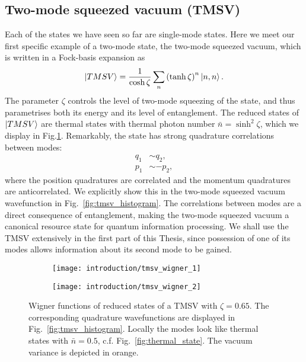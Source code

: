 \FloatBarrier
\subsection{Two-mode squeezed vacuum (TMSV)}
Each of the states we have seen so far are single-mode states. Here we meet our first specific example of a two-mode state, the two-mode squeezed vacuum, which is written in a Fock-basis expansion as
\begin{equation}\label{eqn:intro_tmsv}
\ket{TMSV} = \frac{1}{\cosh \zeta} \sum_n \left( \tanh \zeta \right)^n \ket{n, n}.
\end{equation}
The parameter $\zeta$ controls the level of two-mode squeezing of the state, and thus parametrises both its energy and its level of entanglement. The reduced states of $\ket{TMSV}$ are thermal states with thermal photon number $\bar{n} = \sinh^2 \zeta$, which we display in Fig.\ref{fig:tmsv_wigner}. Remarkably, the state has strong quadrature correlations between modes:
\begin{align*}
q_1 &\sim q_2, \\
p_1 &\sim - p_2,
\end{align*}
where the position quadratures are correlated and the momentum quadratures are anticorrelated. We explicitly show this in the two-mode squeezed vacuum wavefunction in Fig.~\ref{fig:tmsv_histogram}. The correlations between modes are a direct consequence of entanglement, making the two-mode squeezed vacuum a canonical resource state for quantum information processing. We shall use the TMSV extensively in the first part of this Thesis, since possession of one of its modes allows information about its second mode to be gained.



\begin{figure}[htp]
\captionsetup{width=0.8\linewidth}
\centering
	\begin{subfigure}{0.49\linewidth}
		\centering
		\texttt{[image: introduction/tmsv\_wigner\_1]}
	\end{subfigure}
	\begin{subfigure}{0.49\linewidth}
		\centering
		\texttt{[image: introduction/tmsv\_wigner\_2]}
	\end{subfigure}
\caption{\label{fig:tmsv_wigner} Wigner functions of reduced states of a TMSV with $\zeta = 0.65$. The corresponding quadrature wavefunctions are displayed in Fig.~\ref{fig:tmsv_histogram}. Locally the modes look like thermal states with $\bar{n} = 0.5$, c.f. Fig.~\ref{fig:thermal_state}. The vacuum variance is depicted in orange.}
\end{figure}


